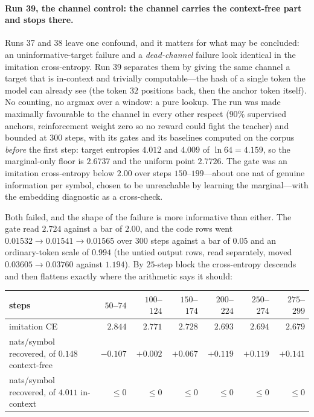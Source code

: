 \documentclass{article} %
\begin{document}
\paragraph{Run 39, the channel control: the channel carries the context-free part and stops there.}
Runs 37 and 38 leave one confound, and it matters for what may be concluded: an uninformative-target
failure and a \emph{dead-channel} failure look identical in the imitation cross-entropy. Run 39
separates them by giving the same channel a target that is in-context and trivially computable---the
hash of a single token the model can already see (the token $32$ positions back, then the anchor
token itself). No counting, no argmax over a window: a pure lookup. The run was made maximally
favourable to the channel in every other respect ($90\%$ supervised anchors, reinforcement weight
zero so no reward could fight the teacher) and bounded at $300$ steps, with its gates and its
baselines computed on the corpus \emph{before} the first step: target entropies $4.012$ and $4.009$
of $\ln 64 = 4.159$, so the marginal-only floor is $2.6737$ and the uniform point $2.7726$. The gate
was an imitation cross-entropy below $2.00$ over steps $150$--$199$---about one nat of genuine
information per symbol, chosen to be unreachable by learning the marginal---with the embedding
diagnostic as a cross-check.

Both failed, and the shape of the failure is more informative than either. The gate read $2.724$
against a bar of $2.00$, and the code rows went $0.01532 \to 0.01541 \to 0.01565$ over $300$ steps
against a bar of $0.05$ and an ordinary-token scale of $0.994$ (the untied output rows, read
separately, moved $0.03605 \to 0.03760$ against $1.194$). By $25$-step block the cross-entropy
descends and then flattens exactly where the arithmetic says it should:

\begin{center}
\begin{tabular}{@{}lrrrrrr@{}}
\toprule
steps                                   & $50$--$74$ & $100$--$124$ & $150$--$174$ & $200$--$224$ & $250$--$274$ & $275$--$299$ \\
\midrule
imitation CE                            & $2.844$ & $2.771$ & $2.728$ & $2.693$ & $2.694$ & $2.679$ \\
nats/symbol recovered, of $0.148$ context-free & $-0.107$ & $+0.002$ & $+0.067$ & $+0.119$ & $+0.119$ & $+0.141$ \\
nats/symbol recovered, of $4.011$ in-context   & $\le 0$ & $\le 0$ & $\le 0$ & $\le 0$ & $\le 0$ & $\le 0$ \\
\bottomrule
\end{tabular}
\end{center}
\end{document}
